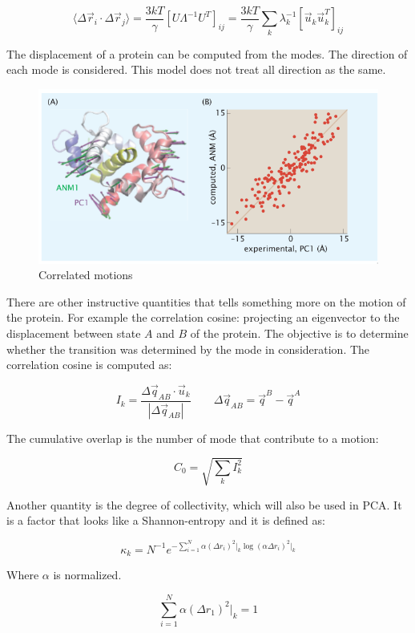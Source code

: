		$$\langle\Delta\vec{r}_i\cdot\Delta\vec{r}_j\rangle = \frac{3kT}{\gamma}[U\Lambda^{-1}U^T]_{ij} = \frac{3kT}{\gamma}\sum\limits_{k}\lambda_k^{-1}[\vec{u}_k\vec{u}_k^T]_{ij}$$

		The displacement of a protein can be computed from the modes.
		The direction of each mode is considered.
		This model does not treat all direction as the same.

		\begin{figure}[H]
			\includegraphics[width=\textwidth]{asm-correlated-motion}
			\caption{Correlated motions}
			\label{fig:as-correlated-motion}
		\end{figure}

		There are other instructive quantities that tells something more on the motion of the protein.
		For example the correlation cosine: projecting an eigenvector to the displacement between state $A$ and $B$ of the protein.
		The objective is to determine whether the transition was determined by the mode in consideration.
		The correlation cosine is computed as:

		$$I_k = \frac{\Delta\vec{q}_{AB}\cdot\vec{u}_k}{|\Delta\vec{q}_{AB}|}\qquad \Delta\vec{q}_{AB} = \vec{q}^B-\vec{q}^A$$

		The cumulative overlap is the number of mode that contribute to a motion:

		$$C_0 = \sqrt{\sum\limits_k I_k^2}$$

		Another quantity is the degree of collectivity, which will also be used in PCA.
		It is a factor that looks like a Shannon-entropy and it is defined as:

		$$\kappa_k = N^{-1}e^{-\sum\limits_{i=1}^N\alpha(\Delta r_i)^2\rvert_k\log(\alpha\Delta r_i)^2\rvert_k}$$

		Where $\alpha$ is normalized.

		$$\sum\limits_{i=1}^N\alpha(\Delta r_1)^2\rvert_k = 1$$

